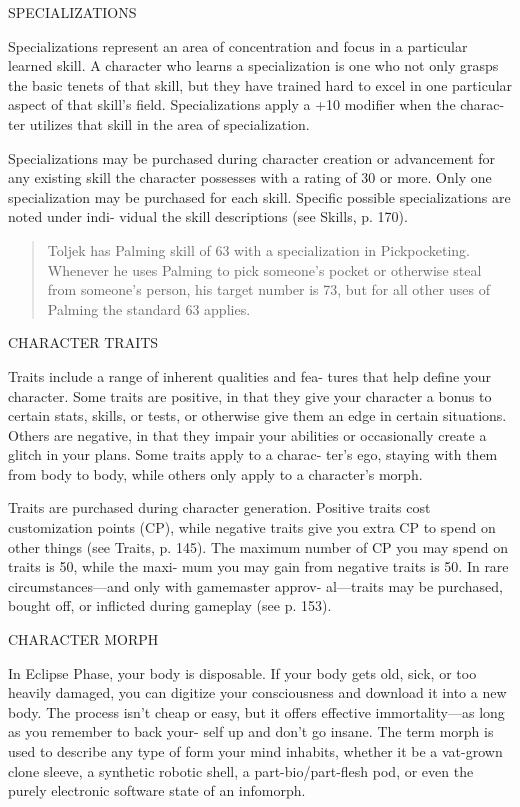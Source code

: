 SPECIALIZATIONS

Specializations represent an area of concentration and
focus in a particular learned skill. A character who
learns a specialization is one who not only grasps the
basic tenets of that skill, but they have trained hard
to excel in one particular aspect of that skill's field.
Specializations apply a +10 modifier when the charac-
ter utilizes that skill in the area of specialization.

Specializations may be purchased during character
creation or advancement for any existing skill the
character possesses with a rating of 30 or more. Only
one specialization may be purchased for each skill.
Specific possible specializations are noted under indi-
vidual the skill descriptions (see Skills, p. 170).

\begin{quotation}
  Toljek has Palming skill of 63 with a specialization in
  Pickpocketing. Whenever he uses Palming to pick someone's pocket or
  otherwise steal from someone's person, his target number is 73, but
  for all other uses of Palming the standard 63 applies.
\end{quotation}

CHARACTER TRAITS

Traits include a range of inherent qualities and fea-
tures that help define your character. Some traits are
positive, in that they give your character a bonus to
certain stats, skills, or tests, or otherwise give them
an edge in certain situations. Others are negative, in
that they impair your abilities or occasionally create
a glitch in your plans. Some traits apply to a charac-
ter's ego, staying with them from body to body, while
others only apply to a character's morph.

Traits are purchased during character generation.
Positive traits cost customization points (CP), while
negative traits give you extra CP to spend on other
things (see Traits, p. 145). The maximum number of
CP you may spend on traits is 50, while the maxi-
mum you may gain from negative traits is 50. In rare
circumstances—and only with gamemaster approv-
al—traits may be purchased, bought off, or inflicted
during gameplay (see p. 153).

CHARACTER MORPH

In Eclipse Phase, your body is disposable. If your body
gets old, sick, or too heavily damaged, you can digitize
your consciousness and download it into a new body.
The process isn't cheap or easy, but it offers effective
immortality—as long as you remember to back your-
self up and don't go insane. The term morph is used to
describe any type of form your mind inhabits, whether
it be a vat-grown clone sleeve, a synthetic robotic shell,
a part-bio/part-flesh pod, or even the purely electronic
software state of an infomorph.


